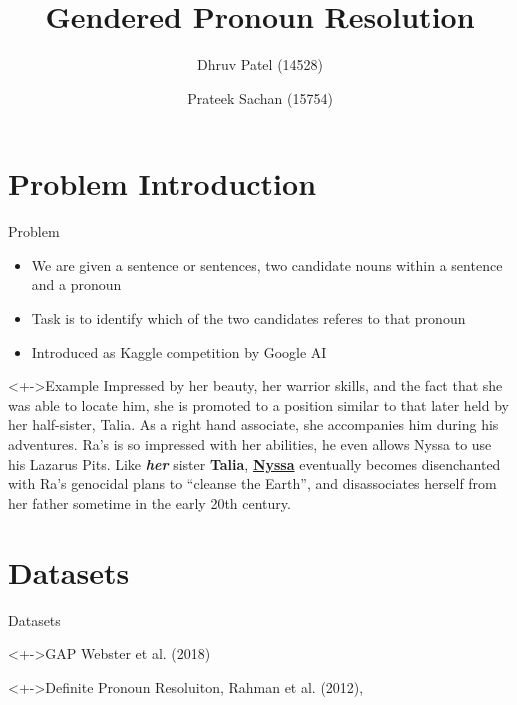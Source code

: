 \documentclass[10pt]{beamer}
\title{Gendered Pronoun Resolution}
\author[Dhruv, Prateek]{ Dhruv Patel (14528) \and Prateek Sachan (15754)}
\institute[CSA, IISc.]{Computer Science and Automation, Indian Institute of Science}
\begin{document}
\begin{frame}
  \maketitle
\end{frame}

\section{Problem Introduction}
\begin{frame}{Problem}
  \begin{itemize}
  \item<+-> We are given a sentence or sentences, two candidate nouns within a sentence and a pronoun
  \item<+-> Task is to identify which of the two candidates referes to that pronoun
  \item<+-> Introduced as Kaggle competition by Google AI
  \end{itemize}

    \begin{block}<+->{Example}
      Impressed by her beauty, her warrior skills, and the fact that she was able to locate him, she is promoted to a position similar to that later held by her half-sister, Talia. As a right hand associate, she accompanies him during his adventures. Ra's is so impressed with her abilities, he even allows Nyssa to use his Lazarus Pits. Like \textit{\textbf{her}} sister \textbf{Talia}, \textbf{\underline{Nyssa}} eventually becomes disenchanted with Ra's genocidal plans to ``cleanse the Earth'', and disassociates herself from her father sometime in the early 20th century.
    \end{block}

\end{frame}

\section{Datasets}
\begin{frame}{Datasets}
  \begin{block}<+->{GAP Webster et al. (2018)\cite{webster2018gap}}
    
  \end{block}

  \begin{block}<+->{Definite Pronoun Resoluiton, Rahman et al. (2012), \cite{rahman2012resolving}}
    
  \end{block}

\end{frame}
\end{document}
